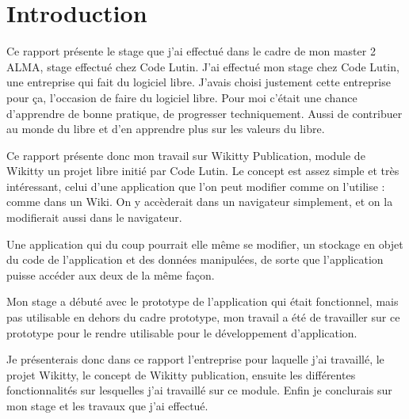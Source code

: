 \section*{Introduction}

Ce rapport présente le stage que j'ai effectué dans le cadre de mon master 2
ALMA, stage effectué chez Code Lutin. J'ai effectué mon stage chez Code Lutin, une
entreprise qui fait du logiciel libre. J'avais choisi justement cette entreprise
pour ça, l'occasion de faire du logiciel libre. Pour moi c'était une chance 
d'apprendre de bonne pratique, de progresser techniquement. Aussi de contribuer au 
monde du libre et d'en apprendre plus sur les valeurs du libre.

Ce rapport présente donc mon travail sur Wikitty Publication, module de Wikitty
un projet libre initié par Code Lutin. Le concept est assez simple et très 
intéressant, celui d'une application que l'on peut modifier comme on l'utilise :
comme dans un Wiki. On y accèderait dans un navigateur simplement, et on la modifierait aussi
dans le navigateur.

Une application qui du coup pourrait elle même se modifier, un stockage en objet
du code de l'application et des données manipulées, de sorte que l'application 
puisse accéder aux deux de la même façon.

Mon stage a débuté avec le prototype de l'application qui était fonctionnel,
mais pas utilisable en dehors du cadre prototype, mon travail a été de travailler
sur ce prototype pour le rendre utilisable pour le développement d'application.

Je présenterais donc dans ce rapport l'entreprise pour laquelle j'ai travaillé,
le projet Wikitty, le concept de Wikitty publication, ensuite les différentes
fonctionnalités sur lesquelles j'ai travaillé sur ce module.
Enfin je conclurais sur mon stage et les travaux que j'ai effectué.

